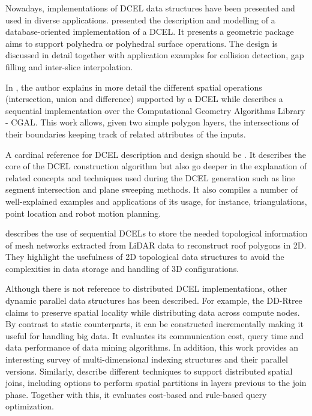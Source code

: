 Nowadays, implementations of DCEL data structures have been presented and used in diverse applications.  \cite{barequet_dcel_1998} presented the description and modelling of a database-oriented implementation of a DCEL. It presents a geometric package aims to support polyhedra or polyhedral surface operations.  The design is discussed in detail together with application examples for collision detection, gap filling and inter-slice interpolation.

In \cite{freiseisen_colored_1998}, the author explains in more detail the different spatial operations (intersection, union and difference) supported by a DCEL while describes a sequential implementation over the Computational Geometry Algorithms Library - CGAL.  This work allows, given two simple polygon layers, the intersections of their boundaries keeping track of related attributes of the inputs.  

A cardinal reference for DCEL description and design should be \cite{berg_computational_2008}.  It describes the core of the DCEL construction algorithm but also go deeper in the explanation of related concepts and techniques used during the DCEL generation such as line segment intersection and plane sweeping methods.  It also compiles a number of well-explained examples and applications of its usage, for instance, triangulations, point location and robot motion planning.

\cite{boltcheva_topological-based_2020} describes the use of sequential DCELs to store the needed topological information of mesh networks extracted from LiDAR data to reconstruct roof polygons in 2D.  They highlight the usefulness of 2D topological data structures to avoid the complexities in data storage and handling of 3D configurations.

Although there is not reference to distributed DCEL implementations, other dynamic parallel data structures has been described.  For example, the DD-Rtree \cite{challa_dd-rtree_2016} claims to preserve spatial locality while distributing data across compute nodes.  By contrast to static counterparts, it can be constructed incrementally making it useful for handling big data.  It evaluates its communication cost, query time and data performance of data mining algorithms.  In addition, this work provides an interesting survey of multi-dimensional indexing structures and their parallel versions.  Similarly, \cite{sabek_spatial_2017} describe different techniques to support distributed spatial joins, including options to perform spatial partitions in layers previous to the join phase.  Together with this, it evaluates cost-based and rule-based query optimization.  

